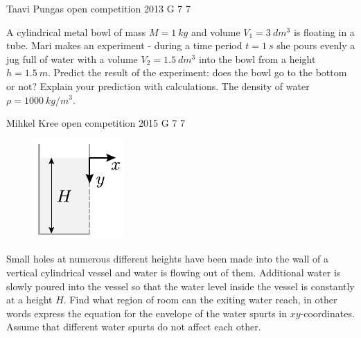 \documentclass[11pt]{article}
\begin{document}
{Taavi Pungas} %
{open competition} %
{2013} %
{G 7} %
{7} %
{

\ifEngStatement
A cylindrical metal bowl of mass $M=\SI{1}{kg}$ and volume $V_1=\SI{3}{dm^3}$ is floating in a tube. Mari makes an experiment - during a time period $t=\SI{1}{s}$ she pours evenly a jug full of water with a volume $V_2=\SI{1,5}{dm^3}$ into the bowl from a height $h=\SI{1,5}{m}$. Predict the result of the experiment: does the bowl go to the bottom or not? Explain your prediction with calculations. The density of water $\rho=\SI{1000}{kg/m^3}$.
\fi
}

{Mihkel Kree} %
{open competition} %
{2015} %
{G 7} %
{7} %
{

\ifEngStatement
\begin{figure}%
\vspace{-15pt}
\includegraphics[width=\linewidth]{2015-lahg-07-veejoadJoon}%
\end{figure}
Small holes at numerous different heights have been made into the wall of a vertical cylindrical vessel and water is flowing out of them. Additional water is slowly poured into the vessel so that the water level inside the vessel is constantly at a height $H$. Find what region of room can the exiting water reach, in other words express the equation for the envelope of the water spurts in $xy$-coordinates. Assume that different water spurts do not affect each other.
\fi
}
\end{document}
